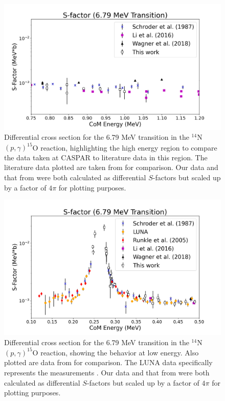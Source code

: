 \begin{figure}
		\includegraphics[width=1.0\linewidth]{figures/highCompare679.png}
	\caption{Differential cross section for the 6.79 MeV transition in the $^{14}$N$\left( p,\gamma \right) ^{15}$O reaction, highlighting the high energy region to compare the data taken at CASPAR to literature data in this region. The literature data plotted are taken from \cite{Schroder1987, Li2016, Wagner2018} for comparison. Our data and that from \citet{Li2016} were both calculated as differential $S$-factors but scaled up by a factor of $4\pi$ for plotting purposes.  }
	\label{fig: highCompare679}
\end{figure}

\begin{figure}
		\includegraphics[width=1.0\linewidth]{figures/low679.png}
	\caption{Differential cross section for the 6.79 MeV transition in the $^{14}$N$\left( p,\gamma \right) ^{15}$O reaction, showing the behavior at low energy. Also plotted are data from \cite{Schroder1987, Formicola2004, Imbriani2005, Runkle2005, Marta2008, Marta2011, Li2016, Wagner2018} for comparison. The LUNA data specifically represents the measurements \cite{Formicola2004, Imbriani2005, Marta2008, Marta2011}. Our data and that from \citet{Li2016} were both calculated as differential $S$-factors but scaled up by a factor of $4\pi$ for plotting purposes. }
	\label{fig: low679}
\end{figure}

